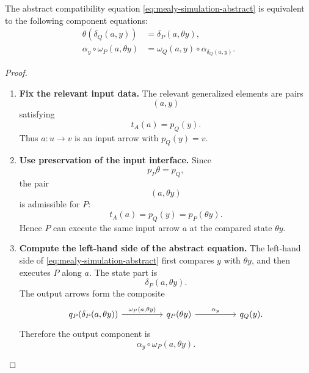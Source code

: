 \begin{proposition}
\label{prop:mealy-simulation-laws}
    The abstract compatibility equation \eqref{eq:mealy-simulation-abstract} is equivalent to the following component equations:
    \begin{align}
        \theta(\delta_Q(a,y))
        &=
        \delta_P(a,\theta y),
        \label{eq:mealy-simulation-delta}
        \\
        \alpha_y\circ \omega_P(a,\theta y)
        &=
        \omega_Q(a,y)\circ \alpha_{\delta_Q(a,y)}.
        \label{eq:mealy-simulation-omega}
    \end{align}
\end{proposition}
\begin{proof}
    \leavevmode
    \begin{enumerate}
        \item \textbf{Fix the relevant input data.} The relevant generalized elements are pairs
        \[
            (a,y)
        \]
        satisfying
        \[
            t_A(a)=p_Q(y).
        \]
        Thus \(a:u\to v\) is an input arrow with \(p_Q(y)=v\).

        \item \textbf{Use preservation of the input interface.} Since
        \[
            p_P\theta=p_Q,
        \]
        the pair
        \[
            (a,\theta y)
        \]
        is admissible for \(P\):
        \[
            t_A(a)=p_Q(y)=p_P(\theta y).
        \]
        Hence \(P\) can execute the same input arrow \(a\) at the compared
        state \(\theta y\).

        \item \textbf{Compute the left-hand side of the abstract equation.} The left-hand side of \eqref{eq:mealy-simulation-abstract} first compares \(y\) with \(\theta y\), and then executes \(P\) along \(a\). The state part is
        \[
            \delta_P(a,\theta y).
        \]
        The output arrows form the composite
        \[
            \begin{tikzcd}[column sep=huge]
                    {q_P(\delta_P(a,\theta y))}
                        \arrow[r, "{\omega_P(a,\theta y)}"]
                &
                    {q_P(\theta y)}
                        \arrow[r, "{\alpha_y}"]
                &
                    {q_Q(y)}.
            \end{tikzcd}
        \]
        Therefore the output component is
        \[
            \alpha_y\circ\omega_P(a,\theta y).
        \]


\end{enumerate}
\end{proof}
